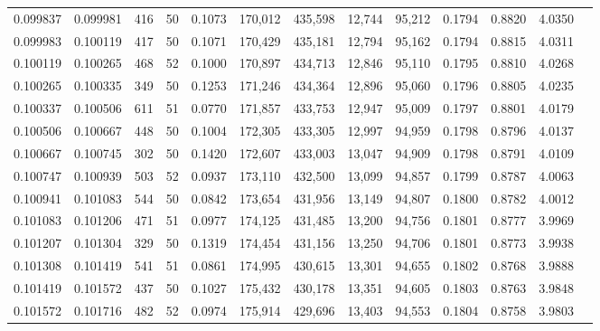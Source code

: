 \begin{tabular}{rrrrrrrrrrrrr}
0.099837 & 0.099981 &   416 &  50 &                                     0.1073 & 170,012 & 435,598 &  12,744 &  95,212 & 0.1794 & 0.8820 & 4.0350 \\
0.099983 & 0.100119 &   417 &  50 &                                     0.1071 & 170,429 & 435,181 &  12,794 &  95,162 & 0.1794 & 0.8815 & 4.0311 \\
0.100119 & 0.100265 &   468 &  52 &                                     0.1000 & 170,897 & 434,713 &  12,846 &  95,110 & 0.1795 & 0.8810 & 4.0268 \\
0.100265 & 0.100335 &   349 &  50 &                                     0.1253 & 171,246 & 434,364 &  12,896 &  95,060 & 0.1796 & 0.8805 & 4.0235 \\
0.100337 & 0.100506 &   611 &  51 &                                     0.0770 & 171,857 & 433,753 &  12,947 &  95,009 & 0.1797 & 0.8801 & 4.0179 \\
0.100506 & 0.100667 &   448 &  50 &                                     0.1004 & 172,305 & 433,305 &  12,997 &  94,959 & 0.1798 & 0.8796 & 4.0137 \\
0.100667 & 0.100745 &   302 &  50 &                                     0.1420 & 172,607 & 433,003 &  13,047 &  94,909 & 0.1798 & 0.8791 & 4.0109 \\
0.100747 & 0.100939 &   503 &  52 &                                     0.0937 & 173,110 & 432,500 &  13,099 &  94,857 & 0.1799 & 0.8787 & 4.0063 \\
0.100941 & 0.101083 &   544 &  50 &                                     0.0842 & 173,654 & 431,956 &  13,149 &  94,807 & 0.1800 & 0.8782 & 4.0012 \\
0.101083 & 0.101206 &   471 &  51 &                                     0.0977 & 174,125 & 431,485 &  13,200 &  94,756 & 0.1801 & 0.8777 & 3.9969 \\
0.101207 & 0.101304 &   329 &  50 &                                     0.1319 & 174,454 & 431,156 &  13,250 &  94,706 & 0.1801 & 0.8773 & 3.9938 \\
0.101308 & 0.101419 &   541 &  51 &                                     0.0861 & 174,995 & 430,615 &  13,301 &  94,655 & 0.1802 & 0.8768 & 3.9888 \\
0.101419 & 0.101572 &   437 &  50 &                                     0.1027 & 175,432 & 430,178 &  13,351 &  94,605 & 0.1803 & 0.8763 & 3.9848 \\
0.101572 & 0.101716 &   482 &  52 &                                     0.0974 & 175,914 & 429,696 &  13,403 &  94,553 & 0.1804 & 0.8758 & 3.9803 \\

\end{tabular}

